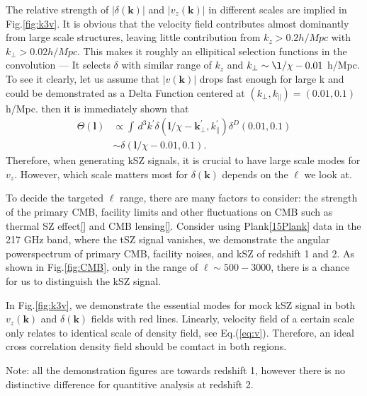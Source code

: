 The relative strength of $|\delta(\bm{k})|$ and $|v_z(\bm{k})|$ in different scales 
are implied in Fig.\ref{fig:k3v}. 
It is obvious that the velocity field contributes almost dominantly from large scale structures, 
leaving little contribution from $k_z>0.2 h/Mpc$ with $k_\perp> 0.02 h/Mpc$. 
This makes it roughly an ellipitical selection functions in the convolution
---
It selects $\delta$ with similar range of $k_z$ and $k_\perp\sim\l/\chi-0.01$ h/Mpc.  
To see it clearly, let us assume that $|v(\bm{k})|$ drops fast enough for 
large k and could be demonstrated as a Delta Function centered at 
$(k_\perp,k_\parallel)=(0.01,0.1)$ h/Mpc. 
then it is immediately shown that 
\begin{eqnarray}
    \Theta(\bm{l}) &\propto \int\, 
    d^3k^\prime\delta(\bm{l}/\chi-\bm{k}_\perp^\prime,k_\parallel^\prime) 
    \delta^D(0.01,0.1) \\
    & \sim \delta(\bm{l}/\chi-0.01,0.1).
\end{eqnarray}
Therefore, when generating kSZ signals, 
it is crucial to have large scale modes for $v_z$. 
However, which scale matters most for $\delta(\bm{k})$ 
depends on the $\ell$ we look at.  

To decide the targeted $\ell$ range, 
there are many factors to consider:  
the strength of the primary CMB, facility limits and 
other fluctuations on CMB such as thermal SZ effect\ref{} and CMB lensing\ref{}.
Consider using Plank\ref{15Plank} data 
in the 217 GHz band, where the tSZ signal vanishes, 
we demonstrate the angular powerspectrum of primary CMB, 
facility noises, 
and kSZ of redshift 1 and 2. 
As shown in Fig.\ref{fig:CMB}, 
only in the range of $\ell \sim 500-3000$, 
there is a chance for us to distinguish the kSZ signal.  

In Fig.\ref{fig:k3v}, we demonstrate the essential modes 
for mock kSZ signal in both $v_z(\bm{k})$ and $\delta(\bm{k})$ fields with red lines. 
Linearly, velocity field of a certain scale only relates to 
identical scale of density field, see Eq.(\ref{eq:v}). 
Therefore, an ideal cross correlation density field should be comtact in both regions. 

Note: all the demonstration figures are towards redshift 1, 
however there is no distinctive difference for quantitive analysis 
at redshift 2.
